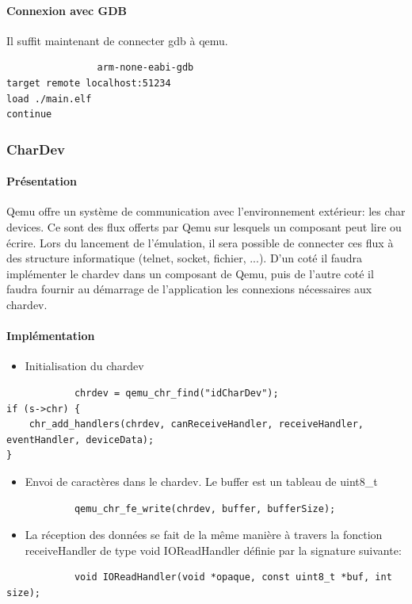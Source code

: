 \documentclass{article}
\begin{document}
			\paragraph{Connexion avec GDB  \\}
			Il suffit maintenant de connecter gdb à qemu. 
			\begin{verbatim}
				arm-none-eabi-gdb
target remote localhost:51234
load ./main.elf
continue
			\end{verbatim}
			
		\subsubsection{CharDev}
			\paragraph{Présentation \\}
			Qemu offre un système de communication avec l'environnement extérieur: les char devices. Ce sont des flux offerts
			par Qemu sur lesquels un composant peut lire ou écrire. Lors du lancement de l'émulation, il sera possible de connecter
			ces flux à des structure informatique (telnet, socket, fichier, ...). D'un coté il faudra implémenter le chardev dans 
			un composant de Qemu, puis de l'autre coté il faudra fournir au démarrage de l'application les connexions nécessaires 
			aux chardev. 
			
			\paragraph{Implémentation \\}
			\begin{itemize}
				\item Initialisation du chardev
			\end{itemize}
			\begin{verbatim}
			chrdev = qemu_chr_find("idCharDev");
if (s->chr) {
    chr_add_handlers(chrdev, canReceiveHandler, receiveHandler, eventHandler, deviceData);
}
			\end{verbatim}
			\begin{itemize}
				\item Envoi de caractères dans le chardev. Le buffer est un tableau de uint8\_t 
			\end{itemize}
			\begin{verbatim}
			qemu_chr_fe_write(chrdev, buffer, bufferSize);
			\end{verbatim}
			\begin{itemize}
				\item La réception des données se fait de la même manière à travers la fonction receiveHandler de type void 
				IOReadHandler définie par la signature suivante:  
			\end{itemize}
			\begin{verbatim}
			void IOReadHandler(void *opaque, const uint8_t *buf, int size);
			\end{verbatim}
			
\end{document}
